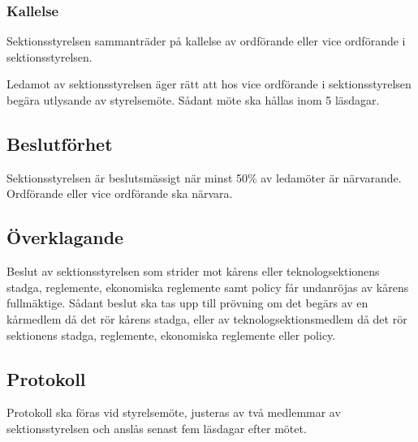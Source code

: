 \subsubsection{Kallelse}
Sektionsstyrelsen sammanträder på kallelse av ordförande eller vice ordförande i sektionsstyrelsen.

Ledamot av sektionsstyrelsen äger rätt att hos vice ordförande i sektionsstyrelsen begära utlysande av styrelsemöte.
Sådant möte ska hållas inom 5 läsdagar.
\subsection{Beslutförhet}
Sektionsstyrelsen är beslutsmässigt när minst 50\% av ledamöter är närvarande. Ordförande eller vice ordförande ska närvara.
\subsection{Överklagande}
Beslut av sektionsstyrelsen som strider mot kårens eller teknologsektionens stadga, reglemente, ekonomiska reglemente samt policy får undanröjas av kårens fullmäktige. Sådant beslut ska tas upp till prövning om det begärs av en kårmedlem då det rör kårens stadga, eller av teknologsektionsmedlem då det rör sektionens stadga, reglemente, ekonomiska reglemente eller policy.
\subsection{Protokoll}
Protokoll ska föras vid styrelsemöte, justeras av två medlemmar av sektionsstyrelsen och anslås senast fem läsdagar efter mötet.

